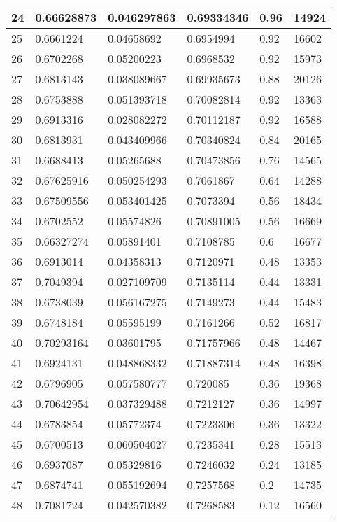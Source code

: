 \begin{longtable}{|l|l|l|l|l|l|}
24 & 0.66628873 & 0.046297863 & 0.69334346 & 0.96 & 14924 \\ \hline 
25 & 0.6661224 & 0.04658692 & 0.6954994 & 0.92 & 16602 \\ \hline 
26 & 0.6702268 & 0.05200223 & 0.6968532 & 0.92 & 15973 \\ \hline 
27 & 0.6813143 & 0.038089667 & 0.69935673 & 0.88 & 20126 \\ \hline 
28 & 0.6753888 & 0.051393718 & 0.70082814 & 0.92 & 13363 \\ \hline 
29 & 0.6913316 & 0.028082272 & 0.70112187 & 0.92 & 16588 \\ \hline 
30 & 0.6813931 & 0.043409966 & 0.70340824 & 0.84 & 20165 \\ \hline 
31 & 0.6688413 & 0.05265688 & 0.70473856 & 0.76 & 14565 \\ \hline 
32 & 0.67625916 & 0.050254293 & 0.7061867 & 0.64 & 14288 \\ \hline 
33 & 0.67509556 & 0.053401425 & 0.7073394 & 0.56 & 18434 \\ \hline 
34 & 0.6702552 & 0.05574826 & 0.70891005 & 0.56 & 16669 \\ \hline 
35 & 0.66327274 & 0.05891401 & 0.7108785 & 0.6 & 16677 \\ \hline 
36 & 0.6913014 & 0.04358313 & 0.7120971 & 0.48 & 13353 \\ \hline 
37 & 0.7049394 & 0.027109709 & 0.7135114 & 0.44 & 13331 \\ \hline 
38 & 0.6738039 & 0.056167275 & 0.7149273 & 0.44 & 15483 \\ \hline 
39 & 0.6748184 & 0.05595199 & 0.7161266 & 0.52 & 16817 \\ \hline 
40 & 0.70293164 & 0.03601795 & 0.71757966 & 0.48 & 14467 \\ \hline 
41 & 0.6924131 & 0.048868332 & 0.71887314 & 0.48 & 16398 \\ \hline 
42 & 0.6796905 & 0.057580777 & 0.720085 & 0.36 & 19368 \\ \hline 
43 & 0.70642954 & 0.037329488 & 0.7212127 & 0.36 & 14997 \\ \hline 
44 & 0.6783854 & 0.05772374 & 0.7223306 & 0.36 & 13322 \\ \hline 
45 & 0.6700513 & 0.060504027 & 0.7235341 & 0.28 & 15513 \\ \hline 
46 & 0.6937087 & 0.05329816 & 0.7246032 & 0.24 & 13185 \\ \hline 
47 & 0.6874741 & 0.055192694 & 0.7257568 & 0.2 & 14735 \\ \hline 
48 & 0.7081724 & 0.042570382 & 0.7268583 & 0.12 & 16560 \\ \hline 

\end{longtable}
